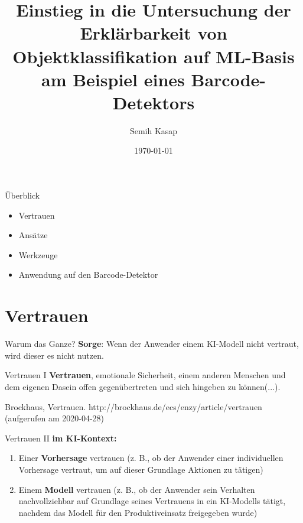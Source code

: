 \documentclass{beamer}
\title{Einstieg in die Untersuchung der Erklärbarkeit von Objektklassifikation auf ML-Basis am Beispiel eines Barcode-Detektors}
\date{\today}
\author{Semih Kasap}
\institute{Institut der Pathologie, Charité Berlin\newline 
Hochschule für Technik und Wirtschaft Berlin}
\begin{document}
  \maketitle
  \begin{frame}{Überblick}
    \begin{itemize}
      \item Vertrauen %
      \item Ansätze
      \item Werkzeuge
      \item Anwendung auf den Barcode-Detektor
    \end{itemize}
  \end{frame}

  \section{Vertrauen}

  \begin{frame}{Warum das Ganze?}
    \textbf{Sorge}: Wenn der Anwender einem KI-Modell nicht vertraut, wird dieser es nicht nutzen.
  \end{frame}

  \begin{frame}{Vertrauen I}
    \textbf{Vertrauen}, emotionale Sicherheit, einem anderen Menschen und dem eigenen Dasein offen gegenübertreten und sich hingeben zu können(...).
    
    Brockhaus, Vertrauen. http://brockhaus.de/ecs/enzy/article/vertrauen (aufgerufen am 2020-04-28)
   \end{frame}

  \begin{frame}{Vertrauen II}
    \textbf{im KI-Kontext:}
    \begin{enumerate}
      \item Einer \textbf{Vorhersage} vertrauen (z. B., ob der Anwender einer individuellen Vorhersage vertraut, um auf dieser Grundlage Aktionen zu tätigen)
      \item Einem \textbf{Modell} vertrauen (z. B., ob der Anwender sein Verhalten nachvollziehbar auf Grundlage seines Vertrauens in ein KI-Modells tätigt, nachdem das Modell für den Produktiveinsatz freigegeben wurde)
    \end{enumerate}
  \end{frame}
\end{document}
